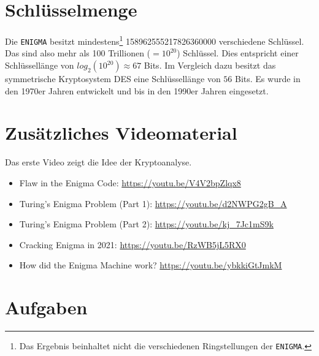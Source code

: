 \vspace{-0.5cm}

\section{Schlüsselmenge}

Die \texttt{ENIGMA} besitzt mindestens\footnote{Das Ergebnis beinhaltet nicht die verschiedenen Ringstellungen der \texttt{ENIGMA}.} \num{158962555217826360000} verschiedene Schlüssel. Das sind also mehr als \num{100} Trillionen ($=10^{20}$) Schlüssel. Dies entspricht einer Schlüssellänge von $log_2(10^{20}) \approx 67$ Bits. Im Vergleich dazu besitzt das symmetrische Kryptosystem \ac{DES} eine Schlüssellänge von $56$ Bits. Es wurde in den 1970er Jahren entwickelt und bis in den 1990er Jahren eingesetzt.

\section{Zusätzliches Videomaterial}

Das erste Video zeigt die Idee der Kryptoanalyse.

\begin{itemize}
	\item Flaw in the Enigma Code: \url{https://youtu.be/V4V2bpZlqx8}
	\item Turing's Enigma Problem (Part 1): \url{https://youtu.be/d2NWPG2gB_A}
	\item Turing's Enigma Problem (Part 2): \url{https://youtu.be/kj_7Jc1mS9k}
	\item Cracking Enigma in 2021: \url{https://youtu.be/RzWB5jL5RX0}
	\item How did the Enigma Machine work? \url{https://youtu.be/ybkkiGtJmkM}
\end{itemize}

\section{Aufgaben}

